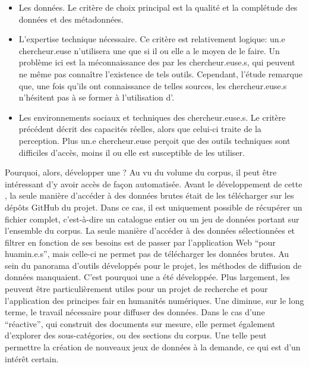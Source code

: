 \begin{itemize}
	\item Les données. Le critère de choix principal est la qualité et la complétude des données et des métadonnées.
	\item L'expertise technique nécessaire. Ce critère est relativement logique: un.e chercheur.euse n'utilisera une \api{} que si il ou elle a le moyen de le faire. Un problème ici est la méconnaissance des \api{} par les chercheur.euse.s, qui peuvent ne même pas connaître l'existence de tels outils. Cependant, l'étude remarque que, une fois qu'ils ont connaissance de telles sources, les chercheur.euse.s n'hésitent pas à se former à l'utilisation d'\api{}.
	\item Les environnements sociaux et techniques des chercheur.euse.s. Le critère précédent décrit des capacités réelles, alors que celui-ci traite de la perception. Plus un.e chercheur.euse perçoit que des outils techniques sont difficiles d'accès, moins il ou elle est susceptible de les utiliser. 
\end{itemize}

Pourquoi, alors, développer une \api{}? Au vu du volume du corpus, il peut être intéressant d'y avoir accès de façon automatisée. Avant le développement de cette \api{}, la seule manière d'accéder à des données brutes était de les télécharger sur les dépôts GitHub du projet. Dans ce cas, il est uniquement possible de récupérer un fichier complet, c'est-à-dire un catalogue entier ou un jeu de données portant sur l'ensemble du corpus. La seule manière d'accéder à des données sélectionnées et filtrer en fonction de ses besoins est de passer par l'application Web \enquote{pour huamin.e.s}, mais celle-ci ne permet pas de télécharger les données brutes. Au sein du panorama d'outils développés pour le projet, les méthodes de diffusion de données manquaient. C'est pourquoi une \api{} a été développée. Plus largement, les \api{} peuvent être particulièrement utiles pour un projet de recherche et pour l'application des principes \gls{fair} en humanités numériques. Une \api{} diminue, sur le long terme, le travail nécessaire pour diffuser des données. Dans le cas d'une \api{} \enquote{réactive}, qui construit des documents sur mesure, elle permet également d'explorer des sous-catégories, ou des sections du corpus. Une telle \api{} peut permettre la création de nouveaux jeux de données à la demande, ce qui est d'un intérêt certain.

